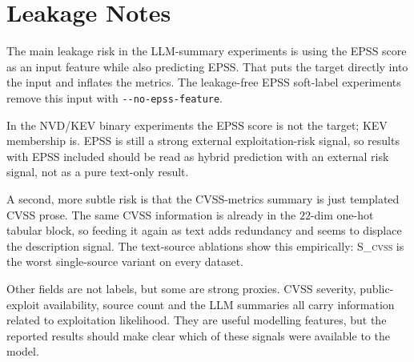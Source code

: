 \documentclass[11pt]{article}
\begin{document}
\section{Leakage Notes}

The main leakage risk in the LLM-summary experiments is using the EPSS
score as an input feature while also predicting EPSS. That puts the
target directly into the input and inflates the metrics. The
leakage-free EPSS soft-label experiments remove this input with
\verb|--no-epss-feature|.

In the NVD/KEV binary experiments the EPSS score is not the target;
KEV membership is. EPSS is still a strong external exploitation-risk
signal, so results with EPSS included should be read as hybrid
prediction with an external risk signal, not as a pure text-only
result.

A second, more subtle risk is that the CVSS-metrics summary is just
templated CVSS prose. The same CVSS information is already in the
$22$-dim one-hot tabular block, so feeding it again as text adds
redundancy and seems to displace the description signal. The
text-source ablations show this empirically: \textsc{S\_cvss} is the
worst single-source variant on every dataset.

Other fields are not labels, but some are strong proxies. CVSS
severity, public-exploit availability, source count and the LLM
summaries all carry information related to exploitation likelihood.
They are useful modelling features, but the reported results should
make clear which of these signals were available to the model.
\end{document}
